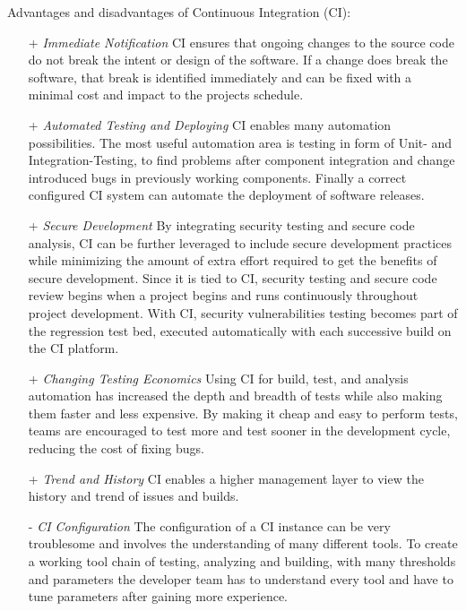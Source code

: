 \documentclass[conference]{IEEEtran}
\begin{document}
Advantages and disadvantages of Continuous Integration (CI)\cite{SecurityinCI}:
\begin{itemize}
	\item[+] \textit{Immediate Notification}
	CI ensures that ongoing changes to the source code do not break the intent or design of the software. If a change does break the software, that break is identified immediately and can be fixed with a minimal cost and impact to the projects schedule.
	\item[+] \textit{Automated Testing and Deploying}
	CI enables many automation possibilities. The most useful automation area is testing in form of Unit- and Integration-Testing, to find problems after component integration and change introduced bugs in previously working components. 
	Finally a correct configured CI system can automate the deployment of software releases. 
	\item[+] \textit{Secure Development}
	By integrating security testing and secure code analysis, CI can be further leveraged to include secure development practices while minimizing the amount of extra effort required to get the benefits of secure development. Since it is tied to CI,
	security testing and secure code review begins when a project begins and runs continuously
	throughout project development. With CI, security vulnerabilities testing becomes part of the regression test bed, executed automatically with each successive build on the CI platform.
	
	\item[+] \textit{Changing Testing Economics}
	Using CI for build, test, and analysis automation has increased the depth and breadth of tests while also making them faster and less expensive. By making it cheap and easy to perform tests, teams are encouraged to test more and test sooner in the development cycle, reducing the cost of fixing bugs.
	
	\item[+] \textit{Trend and History}
	CI enables a higher management layer to view the history and trend of issues and builds.
	
	\item[-] \textit{CI Configuration}
	The configuration of a CI instance can be very troublesome and involves the understanding of many different tools. To create a working tool chain of testing, analyzing and building, with many thresholds and parameters the developer team has to understand every tool and have to tune parameters after gaining more experience.
\end{itemize}
\end{document}
